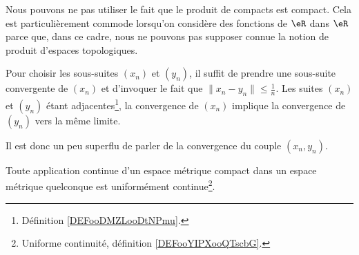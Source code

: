 \begin{remark}
	Nous pouvons ne pas utiliser le fait que le produit de compacts est compact. Cela est particulièrement commode lorsqu'on considère des fonctions de \( \eR\) dans \( \eR\) parce que, dans ce cadre, nous ne pouvons pas supposer connue la notion de produit d'espaces topologiques.

	Pour choisir les sous-suites \( (x_n)\) et \( (y_n)\), il suffit de prendre une sous-suite convergente de \( (x_n)\) et d'invoquer le fait que \( \| x_n-y_n \|\leq \frac{1}{ n }\). Les suites \( (x_n)\) et \( (y_n)\) étant adjacentes\footnote{Définition \ref{DEFooDMZLooDtNPmu}.}, la convergence de \( (x_n)\) implique la convergence de \( (y_n)\) vers la même limite.

	Il est donc un peu superflu de parler de la convergence du couple \( (x_n,y_n)\).
\end{remark}

\begin{proposition}     \label{PROPooBWUFooYhMlDp}
	Toute application continue d'un espace métrique compact dans un espace métrique quelconque est uniformément continue\footnote{Uniforme continuité, définition \ref{DEFooYIPXooQTscbG}.}.
\end{proposition}


